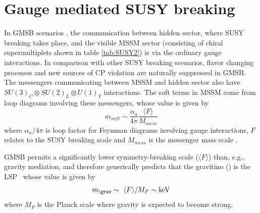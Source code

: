\section{Gauge mediated SUSY breaking}
\label{sec:gmsb}
In GMSB scenarios \cite{Dine:1993yw,Dine:1994vc,Dine:1995ag,Meade:2008wd,Giudice:1998bp,Grajek:2013ola}, the communication between hidden sector, where SUSY breaking takes place, and the visible MSSM sector (consisting of chiral supermultiplets shown in table \ref{tab:SUSY2}) is via the ordinary gauge interactions. In comparison with other SUSY breaking scenarios, flavor changing processes and new sources of CP violation are naturally suppressed \cite{Dine:1993yw} in GMSB. The messengers communicating between MSSM and hidden sector also have $SU(3)_C \otimes SU(2)_L \otimes U(1)_Y$ interactions. The soft terms in MSSM come from loop diagrams involving these messengers, whose value is given by
\begin{equation}
m_{soft} \sim \frac{\alpha_{a}}{4\pi} \frac{\langle F \rangle}{M_{mess}}
\end{equation}
where $\alpha_{a}/{4\pi}$ is loop factor for Feynman diagrams involving gauge interactions, $F$ relates to the SUSY breaking scale and $M_{mess}$ is the messenger mass scale \cite{Martin:1997ns}.

GMSB permits a significantly lower symmetry-breaking scale ($\langle F\rangle$) than, e.g., gravity mediation, and therefore generically predicts that the gravitino (\grav) is the LSP~\cite{Meade:2008wd,PhysRevLett.38.1433,CREMMER1978231} whose value is given by
\begin{equation}
\label{massGrav}
m_{\grav}  \sim \ \langle F \rangle/M_P \sim \mathrm{keV}
\end{equation}
where $M_P$ is the Planck scale where gravity is expected to become strong.

